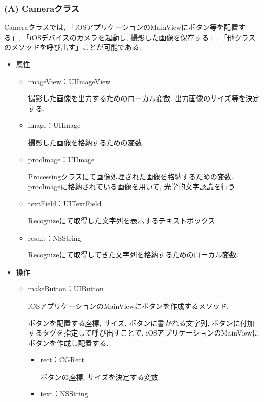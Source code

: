 \subsubsection{(A) Cameraクラス}
Cameraクラスでは, 「iOSアプリケーションのMainViewにボタン等を配置する」, 「iOSデバイスのカメラを起動し, 撮影した画像を保存する」, 「他クラスのメソッドを呼び出す」ことが可能である.

\begin{itemize}
\item 属性

\begin{itemize}
\item imageView：UIImageView

撮影した画像を出力するためのローカル変数.
出力画像のサイズ等を決定する.

\item image：UIImage

撮影した画像を格納するための変数.

\item procImage：UIImage

Processingクラスにて画像処理された画像を格納するための変数.
procImageに格納されている画像を用いて, 光学的文字認識を行う.

\item textField：UITextField

Recognizeにて取得した文字列を表示するテキストボックス.

\item result：NSString

Recognizeにて取得してきた文字列を格納するためのローカル変数.
\end{itemize}

\item 操作

\begin{itemize}
\item makeButton：UIButton

iOSアプリケーションのMainViewにボタンを作成するメソッド.

ボタンを配置する座標, サイズ, ボタンに書かれる文字列, ボタンに付加するタグを指定して呼び出すことで, iOSアプリケーションのMainViewにボタンを作成し配置する.

\begin{itemize}
\item rect：CGRect

ボタンの座標, サイズを決定する変数.

\item text：NSString


\end{itemize}
\end{itemize}
\end{itemize}
